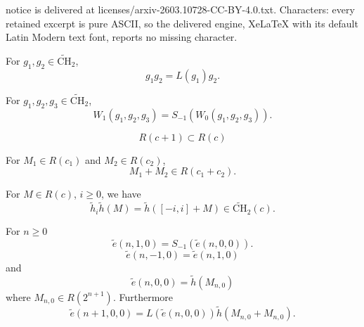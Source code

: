 \documentclass[10pt,a4paper]{amsart}
\newcommand{\tCH}{\tilde{\mathrm{CH}}_2}
\newcommand{\te}{\tilde{e}}
\newcommand{\ti}{\tilde{h}}
\begin{document}
notice is delivered at licenses/arxiv-2603.10728-CC-BY-4.0.txt. Characters: every retained excerpt is pure ASCII, so the delivered engine, XeLaTeX with its default Latin Modern text font, reports no missing character.
\begin{lemma} \label{l action}
For $g_1,g_2 \in \tCH$, 
\[
g_1 g_2 = L(g_1) g_2.
\]
\end{lemma}

\begin{theorem} \label{t W}
For  $g_1,g_2,g_3 \in \tCH$,
\[
W_1(g_1,g_2,g_3) = S_{-1}(W_0(g_1,g_2,g_3)).
\]
\end{theorem} 

\begin{lemma} \label{l Rc add}
\begin{equation} \label{Rc sub}
R(c+1) \subset R(c)
\end{equation}

For $M_1 \in R(c_1)$ and $M_2 \in R(c_2)$, 
\begin{equation} \label{Rc add}
M_1+M_2 \in R(c_1+c_2).
\end{equation}
\end{lemma}

\begin{lemma} \label{l left Rc}
For $M \in R(c)$, $i \geq 0$, we have
\[
\ti_i \ti(M) = \ti([-i,i]+M) \in \tCH(c). 
\]
\end{lemma}

\begin{theorem} \label{t 0 main}
For $n \geq 0$
\begin{equation} \label{s0}
\te(n,1,0) = S_{-1}(\te(n,0,0)).
\end{equation}
\begin{equation} \label{-1eq1}
\te(n,-1,0) = \te(n,1,0)
\end{equation}
and
\begin{equation} \label{multiset 0}
\te(n,0,0)   = \ti(M_{n,0})
\end{equation}
where $M_{n,0} \in R(2^{n+1})$. 
Furthermore
\begin{equation} \label{e0 form}
\te(n+1,0,0) = L(\te(n,0,0)) \ti(M_{n,0} + M_{n,0}).
\end{equation}


\end{theorem}
\end{document}
